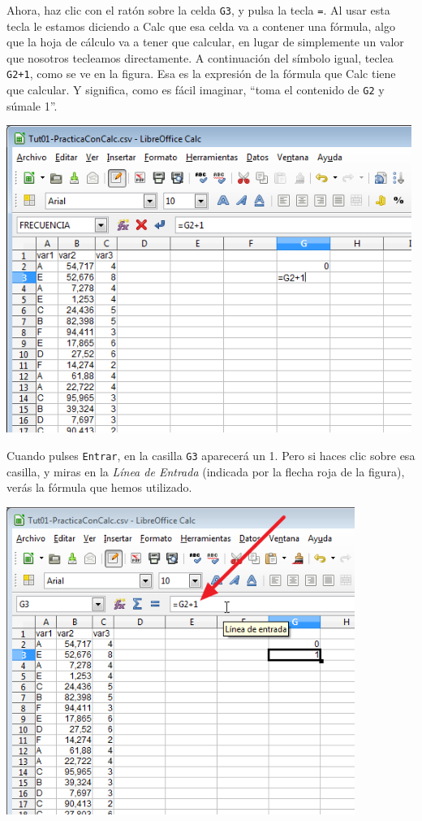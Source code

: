 \documentclass[10pt,a4paper]{article}\usepackage[]{graphicx}\usepackage[]{color}
\newcounter {cont01}
\begin{document}
Ahora,  haz clic con el ratón sobre la celda {\tt G3}, y pulsa la tecla {\tt =}. Al usar esta tecla le estamos diciendo a Calc que esa celda va a contener una {\sf fórmula}, algo que la hoja de cálculo va a tener que calcular, en lugar de simplemente un valor que nosotros tecleamos directamente.  A continuación del símbolo igual, teclea {\tt G2+1}, como se ve en la figura. Esa es la expresión de la fórmula que Calc tiene que calcular. Y significa, como es fácil imaginar, ``toma el contenido de {\tt G2} y súmale 1''.
    \begin{center}
    \includegraphics[height=10cm]{../fig/Tut01-Calc-Formula-01.png}
    \end{center}
Cuando pulses {\tt Entrar}, en la casilla {\tt G3} aparecerá un 1. Pero si haces clic sobre esa casilla, y miras en la {\em Línea de Entrada} (indicada por la flecha roja de la figura), verás la fórmula que hemos utilizado.
    \begin{center}
    \includegraphics[height=10cm]{../fig/Tut01-Calc-Formula-02.png}
    \end{center}
\end{document}

